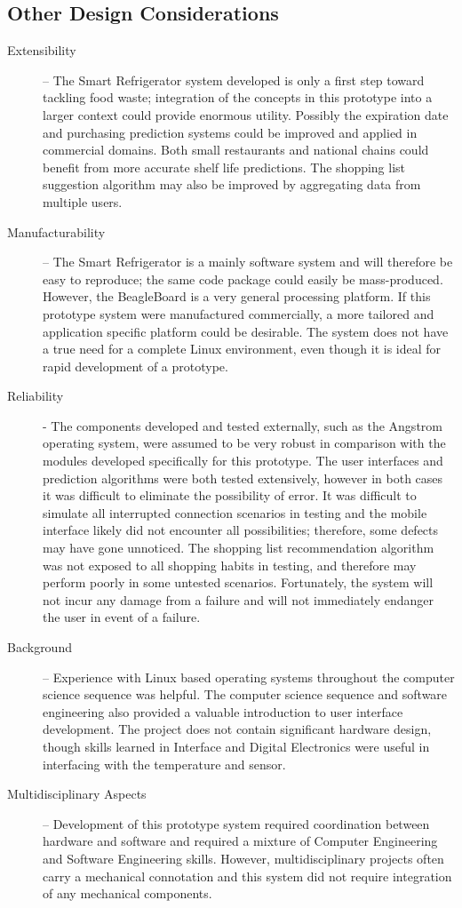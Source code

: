 \documentclass[11pt]{article} %
\begin{document}
\subsection{Other Design Considerations}
\begin{description}
\item[Extensibility] -- The Smart Refrigerator system developed is only a first step toward tackling food waste; integration of the concepts in this prototype into a larger context could provide enormous utility. Possibly the expiration date and purchasing prediction systems could be improved and applied in commercial domains. Both small restaurants and national chains could benefit from more accurate shelf life predictions. The shopping list suggestion algorithm may also be improved by aggregating data from multiple users.
\item[Manufacturability] -- The Smart Refrigerator is a mainly software system and will therefore be easy to reproduce; the same code package could easily be mass-produced. However, the BeagleBoard is a very general processing platform. If this prototype system were manufactured commercially, a more tailored and application specific platform could be desirable. The system does not have a true need for a  complete Linux environment, even though it is ideal for rapid development of a prototype.
\item[Reliability] - The components developed and tested externally, such as the Angstrom operating system, were assumed to be very robust in comparison with the modules developed specifically for this prototype. The user interfaces and prediction algorithms were both tested extensively, however in both cases it was difficult to eliminate the possibility of error. It was difficult to simulate all interrupted connection scenarios in testing and the mobile interface likely did not encounter all possibilities; therefore, some defects may have gone unnoticed. The shopping list recommendation algorithm was not exposed to all shopping habits in testing, and therefore may perform poorly in some untested scenarios. Fortunately, the system will not incur any damage from a failure and will not immediately endanger the user in event of a failure.
\item[Background] -- Experience with Linux based operating systems throughout the computer science sequence was helpful. The computer science sequence and software engineering also provided a valuable introduction to user interface development. The project does not contain significant hardware design, though skills learned in Interface and Digital Electronics were useful in interfacing with the temperature and sensor.
\item[Multidisciplinary Aspects] -- Development of this prototype system required coordination between hardware and software and required a mixture of Computer Engineering and Software Engineering skills. However, multidisciplinary projects often carry a mechanical connotation and this system did not require integration of any mechanical components.
\end{description}
\end{document}
